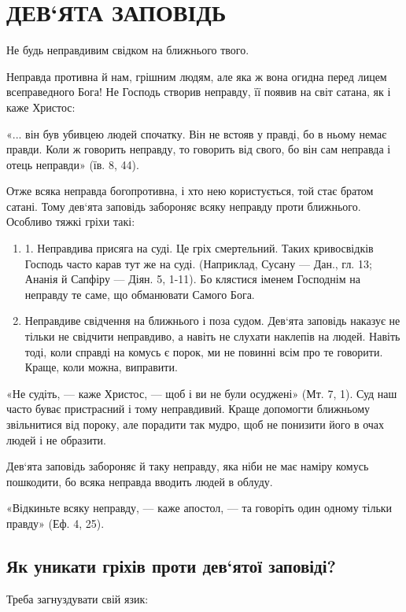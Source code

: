 \documentclass[main.tex]{subfiles}
\begin{document}
\section{ДЕВ`ЯТА ЗАПОВІДЬ}

Не будь неправдивим свідком на ближнього твого.

Неправда противна й нам, грішним людям, але яка ж вона огидна перед лицем всеправедного Бога! Не Господь створив неправду, її появив на світ сатана, як і каже Христос:

«... він був убивцею людей спочатку. Він не встояв у правді, бо в ньому немає правди. Коли ж говорить неправду, то говорить від свого, бо він сам неправда і отець неправди» (їв. 8, 44).
 
Отже всяка неправда богопротивна, і хто нею користується, той стає братом сатані. Тому дев`ята заповідь забороняє всяку неправду проти ближнього. Особливо тяжкі гріхи такі:

\begin{enumerate}
    \item 1. Неправдива присяга на суді. Це гріх смертельний. Таких кривосвідків Господь часто карав тут же на суді. (Наприклад, Сусану — Дан., гл. 13; Ананія й Сапфіру — Діян. 5, 1-11). Бо клястися іменем Господнім на неправду те саме, що обманювати Самого Бога.
    \item Неправдиве свідчення на ближнього і поза судом. Дев`ята заповідь наказує не тільки не свідчити неправдиво, а навіть не слухати наклепів на людей. Навіть тоді, коли справді на комусь є порок, ми не повинні всім про те говорити. Краще, коли можна, виправити.
\end{enumerate}

«Не судіть, — каже Христос, — щоб і ви не були осуджені» (Мт. 7, 1). Суд наш часто буває пристрасний і тому неправдивий. Краще допомогти ближньому звільнитися від пороку, але порадити так мудро, щоб не понизити його в очах людей і не образити.

Дев`ята заповідь забороняє й таку неправду, яка ніби не має наміру комусь пошкодити, бо всяка неправда вводить людей в облуду.

«Відкиньте всяку неправду, — каже апостол, — та говоріть один одному тільки правду» (Еф. 4, 25).

\subsection{Як уникати гріхів проти дев`ятої заповіді?}

Треба загнуздувати свій язик:
\end{document}
